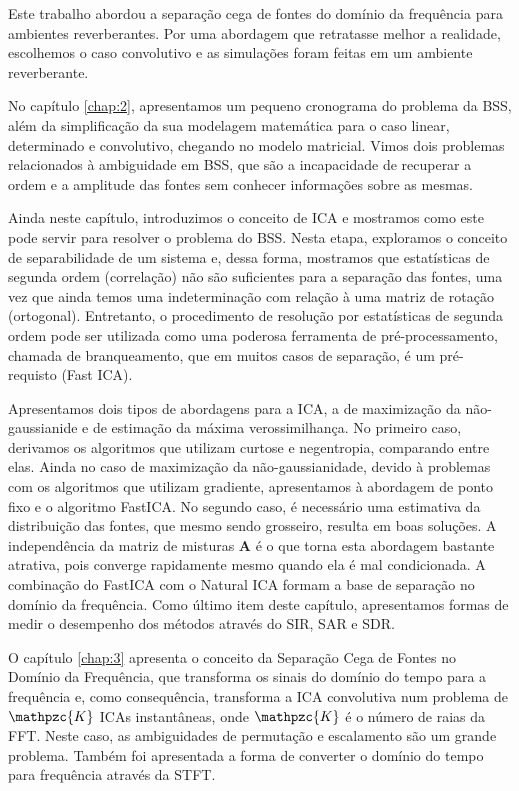 
Este trabalho abordou a separação cega de fontes do domínio da frequência para ambientes reverberantes. Por uma abordagem que retratasse melhor a realidade, escolhemos o caso convolutivo e as simulações foram feitas em um ambiente reverberante.

No capítulo \ref{chap:2}, apresentamos um pequeno cronograma do problema da BSS, além da simplificação da sua modelagem matemática para o caso linear, determinado e convolutivo, chegando no modelo matricial. Vimos dois problemas relacionados à ambiguidade em BSS, que são a incapacidade de recuperar a ordem e a amplitude das fontes sem conhecer informações sobre as mesmas. 

Ainda neste capítulo, introduzimos o conceito de ICA e mostramos como este pode servir para resolver o problema do BSS. Nesta etapa, exploramos o conceito de separabilidade de um sistema e, dessa forma, mostramos que estatísticas de segunda ordem (correlação) não são suficientes para a separação das fontes, uma vez que ainda temos uma indeterminação com relação à uma matriz de rotação (ortogonal). Entretanto, o procedimento de resolução por estatísticas de segunda ordem pode ser utilizada como uma poderosa ferramenta de pré-processamento, chamada de branqueamento, que em muitos casos de separação, é um pré-requisto (Fast ICA). 

Apresentamos dois tipos de abordagens para a ICA, a de maximização da não-gaussianide e de estimação da máxima verossimilhança. No primeiro caso, derivamos os algoritmos que utilizam curtose e negentropia, comparando entre elas. Ainda no caso de maximização da não-gaussianidade, devido à problemas com os algoritmos que utilizam gradiente, apresentamos à abordagem de ponto fixo e o algoritmo FastICA. No segundo caso, é necessário uma estimativa da distribuição das fontes, que mesmo sendo grosseiro, resulta em boas soluções. A independência da matriz de misturas $\mathbf{A}$ é o que torna esta abordagem bastante atrativa, pois converge rapidamente mesmo quando ela é mal condicionada. A combinação do FastICA com o Natural ICA formam a base de separação no domínio da frequência. Como último item deste capítulo, apresentamos formas de medir o desempenho dos métodos através do SIR, SAR e SDR.

O capítulo \ref{chap:3} apresenta o conceito da Separação Cega de Fontes no Domínio da Frequência, que transforma os sinais do domínio do tempo para a frequência e, como consequência, transforma a ICA convolutiva num problema de $\mathpzc{K}$ ICAs instantâneas, onde $\mathpzc{K}$ é o número de raias da FFT. Neste caso, as ambiguidades de permutação e escalamento são um grande problema. Também foi apresentada a forma de converter o domínio do tempo para frequência através da STFT.

